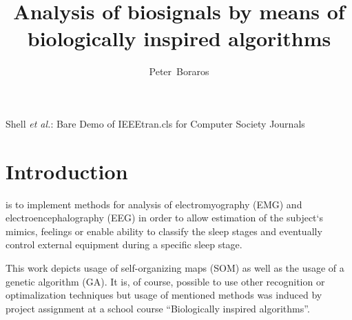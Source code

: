 \documentclass[a4paper,jurnal]{IEEEtran}
\begin{document}
\title{Analysis of biosignals by means of\\ biologically inspired algorithms}

\author{Peter~Boraros%
}



%
{Shell \MakeLowercase{\textit{et al.}}: Bare Demo of IEEEtran.cls for Computer Society Journals}


\maketitle
\IEEEdisplaynotcompsoctitleabstractindextext
\IEEEpeerreviewmaketitle


\section{Introduction}
 is to implement methods for analysis of
electromyography (EMG) and electroencephalography (EEG)
in order to allow estimation of the subject`s mimics, 
feelings or enable ability to classify the sleep stages and eventually control 
external equipment during a specific sleep stage.

This work depicts usage of self-organizing maps (SOM) as well as the usage of a genetic
algorithm (GA). It is, of course, possible to use other recognition or optimalization
techniques but usage of mentioned 
methods was induced by project assignment at a school course ``Biologically inspired 
algorithms''.
\end{document}
